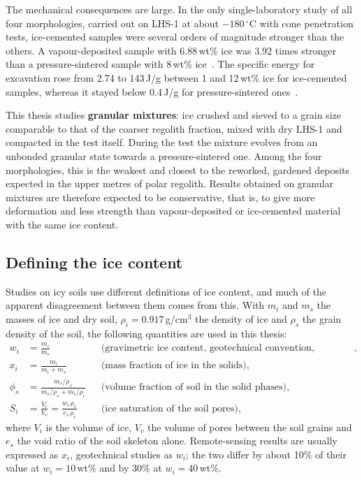 The mechanical consequences are large. In the only single-laboratory study of all four morphologies, carried out on LHS-1 at about $-180\,^\circ$C with cone penetration tests, ice-cemented samples were several orders of magnitude stronger than the others. A vapour-deposited sample with 6.88\,wt\% ice was 3.92 times stronger than a pressure-sintered sample with 8\,wt\% ice~\cite{ricardo2026}. The specific energy for excavation rose from 2.74 to 143\,J/g between 1 and 12\,wt\% ice for ice-cemented samples, whereas it stayed below 0.4\,J/g for pressure-sintered ones~\cite{ricardo2026}.

This thesis studies \textbf{granular mixtures}: ice crushed and sieved to a grain size comparable to that of the coarser regolith fraction, mixed with dry LHS-1 and compacted in the test itself. During the test the mixture evolves from an unbonded granular state towards a pressure-sintered one. Among the four morphologies, this is the weakest and closest to the reworked, gardened deposits expected in the upper metres of polar regolith. Results obtained on granular mixtures are therefore expected to be conservative, that is, to give more deformation and less strength than vapour-deposited or ice-cemented material with the same ice content.

\subsection{Defining the ice content}
\label{subsec:ice_content_def}

Studies on icy soils use different definitions of ice content, and much of the apparent disagreement between them comes from this. With $m_i$ and $m_s$ the masses of ice and dry soil, $\rho_i = 0.917$\,g/cm$^3$ the density of ice and $\rho_s$ the grain density of the soil, the following quantities are used in this thesis:
\begin{align}
    w_i &= \frac{m_i}{m_s} && \text{(gravimetric ice content, geotechnical convention, ``wt\% dry'')},\label{eq:wi}\\
    x_i &= \frac{m_i}{m_i+m_s} && \text{(mass fraction of ice in the solids)},\label{eq:xi}\\
    \phi_s &= \frac{m_s/\rho_s}{m_s/\rho_s + m_i/\rho_i} && \text{(volume fraction of soil in the solid phases)},\label{eq:phis}\\
    S_i &= \frac{V_i}{V_v} = \frac{w_i\,\rho_s}{e_s\,\rho_i} && \text{(ice saturation of the soil pores)},\label{eq:Si}
\end{align}
where $V_i$ is the volume of ice, $V_v$ the volume of pores between the soil grains and $e_s$ the void ratio of the soil skeleton alone. Remote-sensing results are usually expressed as $x_i$, geotechnical studies as $w_i$; the two differ by about 10\% of their value at $w_i = 10$\,wt\% and by 30\% at $w_i = 40$\,wt\%.

